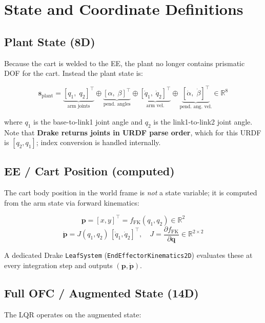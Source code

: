 \documentclass[11pt, a4paper]{article}
\begin{document}
\section{State and Coordinate Definitions}

\subsection{Plant State (8D)}

Because the cart is welded to the EE, the plant no longer contains prismatic
DOF for the cart.  Instead the plant state is:

\[
\bm{s}_{\mathrm{plant}} =
\underbrace{[q_1,\; q_2]^{\top}}_{\text{arm joints}}
\oplus
\underbrace{[\alpha,\; \beta]^{\top}}_{\text{pend.\ angles}}
\oplus
\underbrace{[\dot{q}_1,\; \dot{q}_2]^{\top}}_{\text{arm vel.}}
\oplus
\underbrace{[\dot{\alpha},\; \dot{\beta}]^{\top}}_{\text{pend.\ ang.\ vel.}}
\in \mathbb{R}^{8}
\]

where $q_1$ is the base-to-link1 joint angle and $q_2$ is the link1-to-link2
joint angle.  Note that \textbf{Drake returns joints in URDF parse order},
which for this URDF is $[q_2, q_1]$; index conversion is handled internally.

\subsection{EE / Cart Position (computed)}

The cart body position in the world frame is \emph{not} a state variable; it
is computed from the arm state via forward kinematics:

\[
\bm{p} = [x, y]^{\top} = f_{\mathrm{FK}}(q_1, q_2) \in \mathbb{R}^{2}
\]
\[
\dot{\bm{p}} = J(q_1, q_2)\,[\dot{q}_1, \dot{q}_2]^{\top}, \quad
J = \frac{\partial f_{\mathrm{FK}}}{\partial \bm{q}} \in \mathbb{R}^{2\times 2}
\]

A dedicated Drake \texttt{LeafSystem} (\texttt{EndEffectorKinematics2D})
evaluates these at every integration step and outputs $(\bm{p}, \dot{\bm{p}})$.

\subsection{Full OFC / Augmented State (14D)}

The LQR operates on the augmented state:
\end{document}
